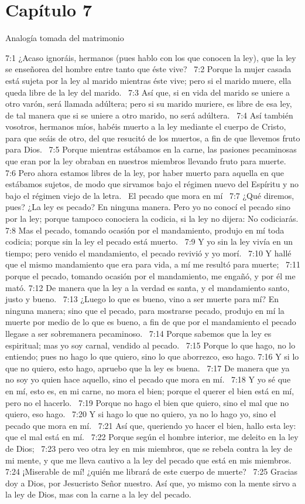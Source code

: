 \section*{Capítulo 7}
Analogía tomada del matrimonio  

7:1 ¿Acaso ignoráis, hermanos (pues hablo con los que conocen la ley), que la ley se enseñorea del hombre entre tanto que éste vive?  
7:2 Porque la mujer casada está sujeta por la ley al marido mientras éste vive; pero si el marido muere, ella queda libre de la ley del marido.  
7:3 Así que, si en vida del marido se uniere a otro varón, será llamada adúltera; pero si su marido muriere, es libre de esa ley, de tal manera que si se uniere a otro marido, no será adúltera.  
7:4 Así también vosotros, hermanos míos, habéis muerto a la ley mediante el cuerpo de Cristo, para que seáis de otro, del que resucitó de los muertos, a fin de que llevemos fruto para Dios.  
7:5 Porque mientras estábamos en la carne, las pasiones pecaminosas que eran por la ley obraban en nuestros miembros llevando fruto para muerte.  
7:6 Pero ahora estamos libres de la ley, por haber muerto para aquella en que estábamos sujetos, de modo que sirvamos bajo el régimen nuevo del Espíritu y no bajo el régimen viejo de la letra.  
El pecado que mora en mí  
7:7 ¿Qué diremos, pues? ¿La ley es pecado? En ninguna manera. Pero yo no conocí el pecado sino por la ley; porque tampoco conociera la codicia, si la ley no dijera: No codiciarás. 
7:8 Mas el pecado, tomando ocasión por el mandamiento, produjo en mí toda codicia; porque sin la ley el pecado está muerto.  
7:9 Y yo sin la ley vivía en un tiempo; pero venido el mandamiento, el pecado revivió y yo morí.  
7:10 Y hallé que el mismo mandamiento que era para vida, a mí me resultó para muerte;  
7:11 porque el pecado, tomando ocasión por el mandamiento, me engañó, y por él me mató. 
7:12 De manera que la ley a la verdad es santa, y el mandamiento santo, justo y bueno.  
7:13 ¿Luego lo que es bueno, vino a ser muerte para mí? En ninguna manera; sino que el pecado, para mostrarse pecado, produjo en mí la muerte por medio de lo que es bueno, a fin de que por el mandamiento el pecado llegase a ser sobremanera pecaminoso.  
7:14 Porque sabemos que la ley es espiritual; mas yo soy carnal, vendido al pecado.  
7:15 Porque lo que hago, no lo entiendo; pues no hago lo que quiero, sino lo que aborrezco, eso hago. 
7:16 Y si lo que no quiero, esto hago, apruebo que la ley es buena.  
7:17 De manera que ya no soy yo quien hace aquello, sino el pecado que mora en mí.  
7:18 Y yo sé que en mí, esto es, en mi carne, no mora el bien; porque el querer el bien está en mí, pero no el hacerlo.  
7:19 Porque no hago el bien que quiero, sino el mal que no quiero, eso hago.  
7:20 Y si hago lo que no quiero, ya no lo hago yo, sino el pecado que mora en mí.  
7:21 Así que, queriendo yo hacer el bien, hallo esta ley: que el mal está en mí.  
7:22 Porque según el hombre interior, me deleito en la ley de Dios;  
7:23 pero veo otra ley en mis miembros, que se rebela contra la ley de mi mente, y que me lleva cautivo a la ley del pecado que está en mis miembros.  
7:24 ¡Miserable de mí! ¿quién me librará de este cuerpo de muerte?  
7:25 Gracias doy a Dios, por Jesucristo Señor nuestro. Así que, yo mismo con la mente sirvo a la ley de Dios, mas con la carne a la ley del pecado.  
